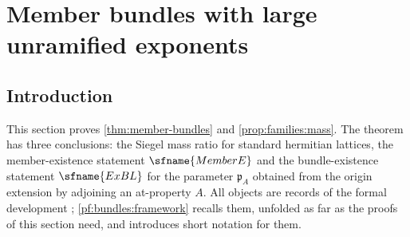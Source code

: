 \section{Member bundles with large unramified exponents}\label{sec:pf:bundles}

\providecommand{\bundK}{\mathcal K}
\providecommand{\bundS}{\mathcal S}
\providecommand{\bundp}{\mathfrak p}
\providecommand{\bundc}{\mathfrak c}
\providecommand{\bundw}{\mathfrak w}
\providecommand{\bundt}{\mathbf t}

\subsection{Introduction}\label{pf:bundles:intro}

This section proves \cref{thm:member-bundles} and \cref{prop:families:mass}. The theorem has three conclusions:
the Siegel mass ratio for standard hermitian lattices, the member-existence statement $\sfname{MemberE}$ and the
bundle-existence statement $\sfname{ExBL}$ for the parameter $\bundp_A$ obtained from the origin extension by adjoining an
at-property $A$. All objects are records of the formal development \cite{LeanSource2026}; \cref{pf:bundles:framework}
recalls them, unfolded as far as the proofs of this section need, and introduces short notation for them.

